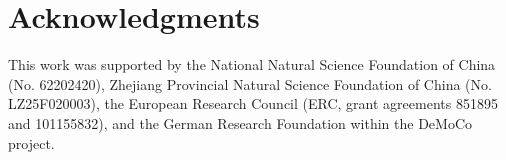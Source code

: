 \section{Acknowledgments}

This work was supported by the National Natural Science Foundation of China (No. 62202420), Zhejiang Provincial Natural Science Foundation of China (No. LZ25F020003), the European Research Council (ERC, grant agreements 851895 and 101155832), and the German Research Foundation within the DeMoCo project.
